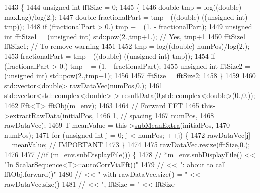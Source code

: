 \begin{DoxyCode}
1443 \{
1444   \textcolor{keywordtype}{unsigned} \textcolor{keywordtype}{int} fftSize = 0;
1445   \{
1446     \textcolor{keywordtype}{double} tmp = log((\textcolor{keywordtype}{double}) maxLag)/log(2.);
1447     \textcolor{keywordtype}{double} fractionalPart = tmp - ((double) ((\textcolor{keywordtype}{unsigned} \textcolor{keywordtype}{int}) tmp));
1448     \textcolor{keywordflow}{if} (fractionalPart > 0.) tmp += (1. - fractionalPart);
1449     \textcolor{keywordtype}{unsigned} \textcolor{keywordtype}{int} fftSize1 = (\textcolor{keywordtype}{unsigned} int) std::pow(2.,tmp+1.); \textcolor{comment}{// Yes, tmp+1}
1450     fftSize1 = fftSize1; \textcolor{comment}{// To remove warning}
1451 
1452     tmp = log((\textcolor{keywordtype}{double}) numPos)/log(2.);
1453     fractionalPart = tmp - ((double) ((\textcolor{keywordtype}{unsigned} \textcolor{keywordtype}{int}) tmp));
1454     \textcolor{keywordflow}{if} (fractionalPart > 0.) tmp += (1. - fractionalPart);
1455     \textcolor{keywordtype}{unsigned} \textcolor{keywordtype}{int} fftSize2 = (\textcolor{keywordtype}{unsigned} int) std::pow(2.,tmp+1);
1456 
1457     fftSize = fftSize2;
1458   \}
1459 
1460   std::vector<double> rawDataVec(numPos,0.);
1461   std::vector<std::complex<double> > resultData(0,std::complex<double>(0.,0.));
1462   Fft<T> fftObj(\hyperlink{class_q_u_e_s_o_1_1_scalar_sequence_a71618cd6351b29361b437af68447a4c8}{m\_env});
1463 
1464   \textcolor{comment}{// Forward FFT}
1465   this->\hyperlink{class_q_u_e_s_o_1_1_scalar_sequence_a998c8f01c49c06076f2ce97a51d4ab2c}{extractRawData}(initialPos,
1466                        1, \textcolor{comment}{// spacing}
1467                        numPos,
1468                        rawDataVec);
1469   T meanValue = this->\hyperlink{class_q_u_e_s_o_1_1_scalar_sequence_a65e9208ee2d0443ad28b29141297153c}{subMeanExtra}(initialPos,
1470                                    numPos);
1471   \textcolor{keywordflow}{for} (\textcolor{keywordtype}{unsigned} \textcolor{keywordtype}{int} j = 0; j < numPos; ++j) \{
1472     rawDataVec[j] -= meanValue; \textcolor{comment}{// IMPORTANT}
1473   \}
1474 
1475   rawDataVec.resize(fftSize,0.);
1476 
1477   \textcolor{comment}{//if (m\_env.subDisplayFile()) \{}
1478   \textcolor{comment}{//  *m\_env.subDisplayFile() << "In ScalarSequence<T>::autoCorrViaFft()"}
1479   \textcolor{comment}{//                          << ": about to call fftObj.forward()"}
1480   \textcolor{comment}{//                          << " with rawDataVec.size() = " << rawDataVec.size()}
1481   \textcolor{comment}{//                          << ", fftSize = "            << fftSize}

\end{DoxyCode}
